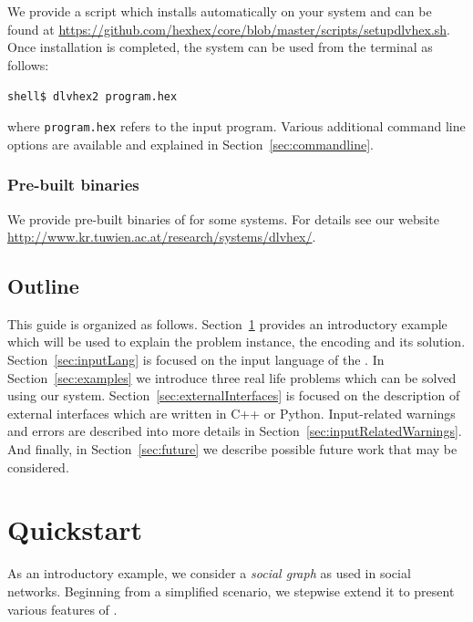 \documentclass[a4paper, titlepage]{article}
\begin{document}
We provide a script which installs \dlvhex{} 
automatically on your system and can be found at 
\url{https://github.com/hexhex/core/blob/master/scripts/setupdlvhex.sh}.
Once installation is completed, the system can be used from 
the terminal as follows:\\ 
\centerline{\texttt{shell\$ dlvhex2 program.hex}} where 
\texttt{program.hex} refers to the input program. Various 
additional command line options are available and explained in Section~\ref{sec:commandline}.    

\subsubsection{Pre-built binaries}
We provide pre-built binaries of \dlvhex{} for some 
systems. For details see our website 
\url{http://www.kr.tuwien.ac.at/research/systems/dlvhex/}. 

\subsection{Outline}
This guide is organized as follows. Section~\ref{sec:quick} 
provides an introductory example which will be used to 
explain the problem instance, the encoding and its 
solution. Section~\ref{sec:inputLang} is focused on the input 
language of the \dlvhex{}. In Section~\ref{sec:examples} we 
introduce three real life problems which can be solved 
using our system. Section~\ref{sec:externalInterfaces} is 
focused on the description of external interfaces which are 
written in C++ or Python. Input-related warnings and errors 
are described into more details in 
Section~\ref{sec:inputRelatedWarnings}. And finally, in 
Section~\ref{sec:future} we describe possible future work 
that may be considered.

\section{Quickstart} %
\label{sec:quick}
As an introductory example, we consider a \emph{social 
graph} as used in social networks. Beginning from a 
simplified scenario, we stepwise extend it to present 
various features of \dlvhex{}.
\end{document}
